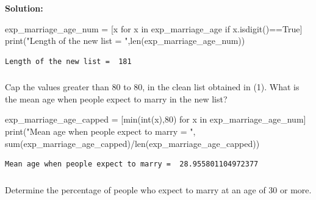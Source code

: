 \documentclass[
  letterpaper,
  DIV=11,
  numbers=noendperiod]{scrreprt}
\newenvironment{Shaded}{\begin{snugshade}}{\end{snugshade}}
\newcommand{\BuiltInTok}[1]{\textcolor[rgb]{0.00,0.23,0.31}{#1}}
\newcommand{\ControlFlowTok}[1]{\textcolor[rgb]{0.00,0.23,0.31}{#1}}
\newcommand{\DecValTok}[1]{\textcolor[rgb]{0.68,0.00,0.00}{#1}}
\newcommand{\KeywordTok}[1]{\textcolor[rgb]{0.00,0.23,0.31}{#1}}
\newcommand{\NormalTok}[1]{\textcolor[rgb]{0.00,0.23,0.31}{#1}}
\newcommand{\OperatorTok}[1]{\textcolor[rgb]{0.37,0.37,0.37}{#1}}
\newcommand{\StringTok}[1]{\textcolor[rgb]{0.13,0.47,0.30}{#1}}
\newcommand{\VariableTok}[1]{\textcolor[rgb]{0.07,0.07,0.07}{#1}}
\begin{document}
\textbf{Solution:}

\begin{Shaded}
\begin{Highlighting}[]
\NormalTok{exp\_marriage\_age\_num }\OperatorTok{=}\NormalTok{ [x }\ControlFlowTok{for}\NormalTok{ x }\KeywordTok{in}\NormalTok{ exp\_marriage\_age }\ControlFlowTok{if}\NormalTok{ x.isdigit()}\OperatorTok{==}\VariableTok{True}\NormalTok{]}
\BuiltInTok{print}\NormalTok{(}\StringTok{"Length of the new list = "}\NormalTok{,}\BuiltInTok{len}\NormalTok{(exp\_marriage\_age\_num))}
\end{Highlighting}
\end{Shaded}

\begin{verbatim}
Length of the new list =  181
\end{verbatim}

\hypertarget{section-1}{%
\subsubsection{}\label{section-1}}

Cap the values greater than 80 to 80, in the clean list obtained in (1).
What is the mean age when people expect to marry in the new list?

\begin{Shaded}
\begin{Highlighting}[]
\NormalTok{exp\_marriage\_age\_capped }\OperatorTok{=}\NormalTok{ [}\BuiltInTok{min}\NormalTok{(}\BuiltInTok{int}\NormalTok{(x),}\DecValTok{80}\NormalTok{) }\ControlFlowTok{for}\NormalTok{ x }\KeywordTok{in}\NormalTok{ exp\_marriage\_age\_num]}
\BuiltInTok{print}\NormalTok{(}\StringTok{"Mean age when people expect to marry = "}\NormalTok{, }\BuiltInTok{sum}\NormalTok{(exp\_marriage\_age\_capped)}\OperatorTok{/}\BuiltInTok{len}\NormalTok{(exp\_marriage\_age\_capped))}
\end{Highlighting}
\end{Shaded}

\begin{verbatim}
Mean age when people expect to marry =  28.955801104972377
\end{verbatim}

\hypertarget{section-2}{%
\subsubsection{}\label{section-2}}

Determine the percentage of people who expect to marry at an age of 30
or more.
\end{document}
